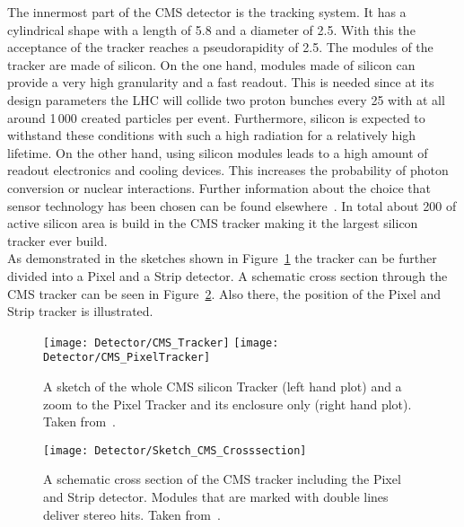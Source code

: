 The innermost part of the CMS detector is the tracking system. It has a cylindrical shape with a length of 5.8\m{} and a diameter of 2.5\m{}. With this the acceptance of the tracker reaches a pseudorapidity of 2.5. The modules of the tracker are made of silicon. On the one hand, modules made of silicon can provide a very high granularity and a fast readout. This is needed since at its design parameters the LHC will collide two proton bunches every 25\ns{} with at all around 1\,000 created particles per event. Furthermore, silicon is expected to withstand these conditions with such a high radiation for a relatively high lifetime. On the other hand, using silicon modules leads to a high amount of readout electronics and cooling devices. This increases the probability of photon conversion or nuclear interactions. Further information about the choice that sensor technology has been chosen can be found elsewhere~\cite{Chatrchyan:1129810}. In total about 200\ms{} of active silicon area is build in the CMS tracker making it the largest silicon tracker ever build.\\
As demonstrated in the sketches shown in Figure~\ref{plot:LHCCMSTrackerCMS} the tracker can be further divided into a Pixel and a Strip detector. A schematic cross section through the CMS tracker can be seen in Figure~\ref{plot:LHCCMSTrackerCrossCMS}. Also there, the position of the Pixel and Strip tracker is illustrated.

\begin{figure}[!Hhtb]
    \centering
    \texttt{[image: Detector/CMS\_Tracker]}
    \texttt{[image: Detector/CMS\_PixelTracker]}
    \caption[Sketches of the CMS Tracker]{A sketch of the whole CMS silicon Tracker (left hand plot) and a zoom to the Pixel Tracker and its enclosure only (right hand plot). Taken from~. \label{plot:LHCCMSTrackerCMS}}
\end{figure}

\begin{figure}[!Hhtb]
    \centering
    \texttt{[image: Detector/Sketch\_CMS\_Crosssection]}
    \caption[Schematic cross section of the CMS Tracker]{A schematic cross section of the CMS tracker including the Pixel and Strip detector. Modules that are marked with double lines deliver stereo hits. Taken from~. \label{plot:LHCCMSTrackerCrossCMS}}
\end{figure}

